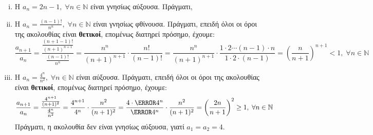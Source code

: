 \documentclass[a4paper,table]{report}
\begin{document}
\begin{examples}
\item {}
  \begin{enumerate}[i)]
    \item Η $ a_{n} = 2n-1, \; \forall n \in \mathbb{N} $ είναι γνησίως 
      αύξουσα. Πράγματι,


    \item Η $ a_{n} = \frac{(n-1)!}{n^{n}}, \; \forall n \in 
      \mathbb{N} $ 
      είναι γνησίως φθίνουσα. Πράγματι, επειδή όλοι οι όροι της ακολουθίας 
      είναι \textbf{θετικοί}, επομένως διατηρεί πρόσημο, έχουμε:
      \[
        \frac{a_{n+1}}{a_n} =
        \frac{\frac{(n+1-1)!}{(n+1)^{n+1}}}{\frac{(n-1)!}{n^{n}}} 
        = \frac{n^{n}}{(n+1)^{n+1}}\cdot \frac{n!}{(n-1)!} 
        = \frac{n^{n}}{(n+1)^{n+1}}\cdot \frac{1\cdot 2\cdots (n-1)\cdot n}{1 \cdot 2
        \cdot (n-1)}  
        = \left(\frac{n}{n+1} \right)^{n+1} < 1, \; \forall n \in \mathbb{N} 
      \] 

    \item Η $ a_{n}= \frac{4^{n}}{n^{2}}, \; \forall n \in \mathbb{N} $ 
      είναι αύξουσα. Πράγματι, επειδή όλοι οι όροι της ακολουθίας 
      είναι \textbf{θετικοί}, επομένως διατηρεί πρόσημο, έχουμε:
      \[
        \frac{a_{n+1}}{a_{n}} 
        = \frac{\frac{4^{n+1}}{(n+1)^{2}}}{\frac{4^{n}}{n^{2}}} 
        = \frac{4^{n+1}}{4^{n}}\cdot \frac{n^{2}}{(n+1)^{2}}  
        = \frac{4\cdot \cancel{4^{n}}}{\cancel{4^{n}}} \cdot \frac{n^{2}}{(n+1)^{2}}
        = \left( \frac{2n}{n+1} \right)^{2} \geq 1, 
        \; \forall n \in \mathbb{N} 
      \]
      Πράγματι, η ακολουθία δεν είναι γνησίως αύξουσα, γιατί $ a_{1}= a_{2}=4$.


\end{enumerate}
\end{examples}
\end{document}

